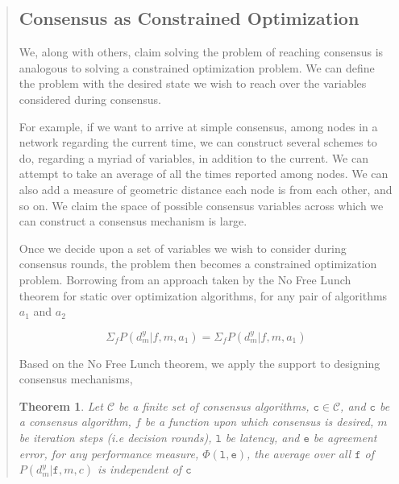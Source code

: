 \documentclass[12pt, titlepage, twocolumn]{report}
\newtheorem{theorem}{Theorem}
\begin{document}
\begin{quotation}
\subsection{Consensus as Constrained Optimization}
We, along with others, claim solving the problem of reaching consensus is analogous to solving a constrained optimization problem. We can define the problem with the desired state we wish to reach over the variables considered during consensus.

For example, if we want to arrive at simple consensus, among nodes in a network regarding the current time, we can construct several schemes to do, regarding a myriad of variables, in addition to the current. We can attempt to take an average of all the times reported among nodes. We can also add a measure of geometric distance each node is from each other, and so on. We claim the space of possible consensus variables across which we can construct a consensus mechanism is large.

Once we decide upon a set of variables we wish to consider during consensus  rounds, the problem then becomes a constrained optimization problem. Borrowing from an approach taken by the No Free Lunch theorem for static over optimization algorithms, for any pair of algorithms \(a_1\) and \(a_2\) 

\begin{equation}
	\Sigma_f P(d^{y}_{m} \vert f, m, a_1) = \Sigma_f P(d^{y}_{m} \vert f, m, a_1) 
\end{equation}


Based on the No Free Lunch theorem, we apply the support to designing consensus mechanisms,


\begin{theorem}
	Let \( \mathcal{C} \) be a finite set of consensus algorithms, \( \texttt{c} \in \mathcal{C} \), and \(\texttt{c}\) be a consensus algorithm, \(f\) be a function upon which consensus is desired, \(m\) be iteration steps (i.e decision rounds), \(\texttt{l}\) be latency, and \( \texttt{e} \) be agreement error, for any performance measure, \( \Phi(\texttt{l}, \texttt{e}) \), the average over all \(\texttt{f}\) of \(P( d_{m}^{y} \vert \texttt{f}, m, c )\) is independent of \( \texttt{c} \)
\end{theorem}


\end{quotation}
\end{document}
